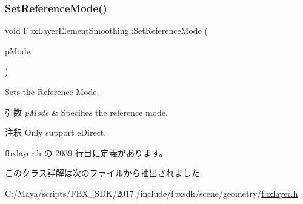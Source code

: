 \mbox{\label{class_fbx_layer_element_smoothing_a8c17c1dad55d4a42648c6f40337dd8c5}} 
\subsubsection{\texorpdfstring{Set\+Reference\+Mode()}{SetReferenceMode()}}
{\footnotesize\ttfamily void Fbx\+Layer\+Element\+Smoothing\+::\+Set\+Reference\+Mode (\begin{DoxyParamCaption}\item[{\hyperlink{class_fbx_layer_element_a00f04654580ca9b2f5d292c11abd83fc}{Fbx\+Layer\+Element\+::\+E\+Reference\+Mode}}]{p\+Mode }\end{DoxyParamCaption})\hspace{0.3cm}{\ttfamily [inline]}}

Sets the Reference Mode. 
\begin{DoxyParams}{引数}
{\em p\+Mode} & Specifies the reference mode. \\
\hline
\end{DoxyParams}
\begin{DoxyRemark}{注釈}
Only support e\+Direct. 
\end{DoxyRemark}


 fbxlayer.\+h の 2039 行目に定義があります。



このクラス詳解は次のファイルから抽出されました\+:\begin{DoxyCompactItemize}
\item 
C\+:/\+Maya/scripts/\+F\+B\+X\+\_\+\+S\+D\+K/2017./include/fbxsdk/scene/geometry/\hyperlink{fbxlayer_8h}{fbxlayer.\+h}\end{DoxyCompactItemize}
